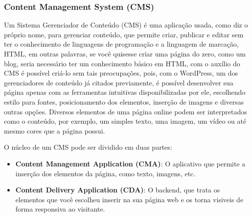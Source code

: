 \documentclass[12pt,twoside,english,brazilian]{article}
\begin{document}
\subsubsection{Content Management System (CMS)}

Um Sistema Gerenciador de Conteúdo (CMS) é uma aplicação usada, como diz o próprio nome, para gerenciar conteúdo, que permite criar, publicar e editar sem ter o conhecimento de linguagens de programação e a linguagem de marcação, HTML, em outras palavras, se você quisesse criar uma página do zero, como um blog, seria necessário ter um conhecimento básico em HTML, com o auxílio do CMS é possível criá-lo sem tais preocupações, pois, com o WordPress, um dos gerenciadores de conteúdo já citados previamente, é possível desenvolver sua página apenas com as ferramentas intuitivas disponibilizadas por ele, escolhendo estilo para fontes, posicionamento dos elementos, inserção de imagens e diversas outras opções. Diversos elementos de uma página online podem ser interpretados como o conteúdo, por exemplo, um simples texto, uma imagem, um vídeo ou até mesmo cores que a página possui.

O núcleo de um CMS pode ser dividido em duas partes:
\begin{itemize}
    \item {\bfseries Content Management Application (CMA)}: O aplicativo que permite a inserção dos elementos da página, como texto, imagens, etc.

    \item {\bfseries Content Delivery Application (CDA)}: O backend, que trata os elementos que você escolheu inserir na sua página web e os torna visiveis de forma responsiva ao visitante.
\end{itemize}
\end{document}
